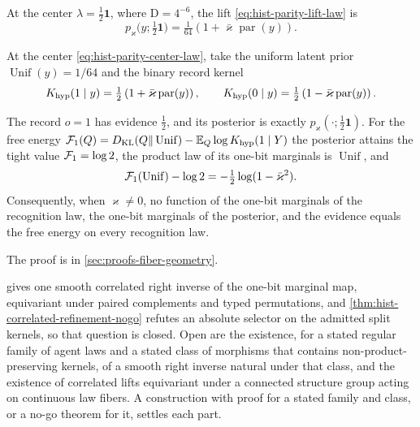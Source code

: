 At the center $\lambda=\tfrac12\mathbf 1$, where $\mathrm D=4^{-6}$, the lift
\eqref{eq:hist-parity-lift-law} is
\begin{equation}
p_\varkappa\bigl(y;\tfrac12\mathbf 1\bigr)
=\tfrac1{64}\left(1+\bar\varkappa\operatorname{par}(y)\right).
\label{eq:hist-parity-center-law}
\end{equation}

At the center \eqref{eq:hist-parity-center-law}, take the uniform latent prior
$\operatorname{Unif}(y)=1/64$ and the binary record kernel
\begin{equation}
K_{\mathrm{hyp}}(1\mid y)=\tfrac12\left(1+\bar\varkappa\operatorname{par}(y)\right),
\qquad
K_{\mathrm{hyp}}(0\mid y)=\tfrac12\left(1-\bar\varkappa\operatorname{par}(y)\right).
\label{eq:hist-parity-hyperedge-kernel}
\end{equation}

The record $o=1$ has evidence $\tfrac12$, and its posterior is exactly
$p_\varkappa(\cdot;\tfrac12\mathbf 1)$.  For the free energy
$\mathcal F_1(Q)=D_{\mathrm{KL}}(Q\Vert\operatorname{Unif})-\mathbb E_Q\log K_{\mathrm{hyp}}(1\mid Y)$ the
posterior attains the tight value $\mathcal F_1=\log2$, the product law of its one-bit
marginals is $\operatorname{Unif}$, and
\begin{equation}
\mathcal F_1(\operatorname{Unif})-\log2=-\tfrac12\log(1-\bar\varkappa^2).
\label{eq:hist-parity-product-lift-excess}
\end{equation}
Consequently, when $\varkappa\ne0$, no function of the one-bit marginals of the
recognition law, the one-bit marginals of the posterior, and the evidence equals the free
energy on every recognition law.  

The proof is in \cref{sec:proofs-fiber-geometry}.

 gives one smooth correlated right inverse of the
one-bit marginal map, equivariant under paired complements and typed permutations, and
\cref{thm:hist-correlated-refinement-nogo} refutes an absolute selector on the admitted
split kernels, so that question is closed.  Open are the existence, for a stated regular
family of agent laws and a stated class of morphisms that contains
non-product-preserving kernels, of a smooth right inverse natural under that class, and
the existence of correlated lifts equivariant under a connected structure group acting on
continuous law fibers.  A construction with proof for a stated family and class, or a
no-go theorem for it, settles each part.

